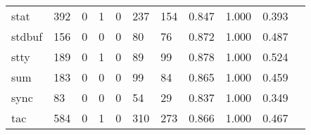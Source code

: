 \begin{longtable}{lp{1.2cm}p{1.2cm}p{1.2cm}p{1.2cm}p{1.2cm}p{1.2cm}p{1.2cm}p{1.2cm}p{1.2cm}p{1.2cm}}
stat      &                                   392 &                                                  0 &                                                  1 &                                                  0 &                                                237 &                                                154 &                                         0.847 &                                              1.000 &                                              0.393 \\
stdbuf    &                                   156 &                                                  0 &                                                  0 &                                                  0 &                                                 80 &                                                 76 &                                         0.872 &                                              1.000 &                                              0.487 \\
stty      &                                   189 &                                                  0 &                                                  1 &                                                  0 &                                                 89 &                                                 99 &                                         0.878 &                                              1.000 &                                              0.524 \\
sum       &                                   183 &                                                  0 &                                                  0 &                                                  0 &                                                 99 &                                                 84 &                                         0.865 &                                              1.000 &                                              0.459 \\
sync      &                                    83 &                                                  0 &                                                  0 &                                                  0 &                                                 54 &                                                 29 &                                         0.837 &                                              1.000 &                                              0.349 \\
tac       &                                   584 &                                                  0 &                                                  1 &                                                  0 &                                                310 &                                                273 &                                         0.866 &                                              1.000 &                                              0.467 \\

\end{longtable}
